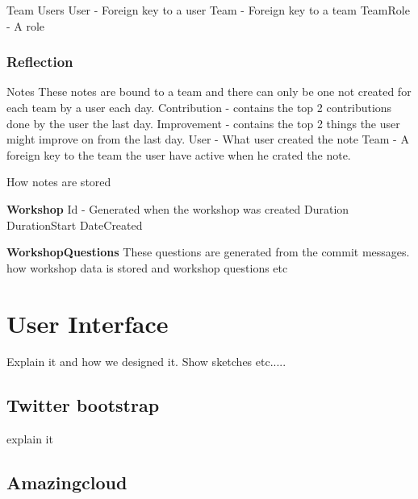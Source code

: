 Team Users
User - Foreign key to a user
Team - Foreign key to a team
TeamRole - A role 

\subsubsection{Reflection}
Notes
These notes are bound to a team and there can only be one not created for each team by a user each day.
Contribution - contains the top 2 contributions done by the user the last day.
Improvement - contains the top 2 things the user might improve on from the last day.
User - What user created the note
Team - A foreign key to the team the user have active when he crated the note.

How notes are stored

\textbf{Workshop} 
Id - Generated when the workshop was created
Duration
DurationStart
DateCreated


\textbf{WorkshopQuestions}
These questions are generated from the commit messages.
how workshop data is stored and workshop questions etc

\section{User Interface}
Explain it and how we designed it. Show sketches etc.....

\subsection{Twitter bootstrap}
explain it

\subsection{Amazingcloud}